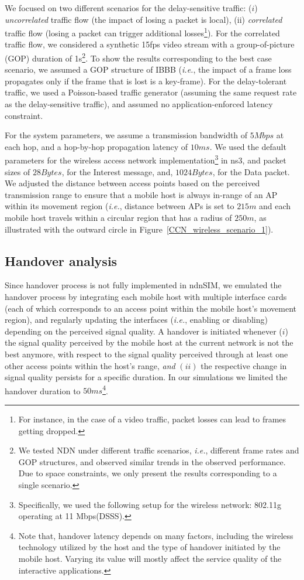 \documentclass[conference]{IEEEtran}
\begin{document}
We focused on two different scenarios for the delay-sensitive traffic: ($i$) \emph{uncorrelated} traffic flow (the impact of losing a packet is local), (ii) \emph{correlated} traffic flow (losing a packet can trigger additional losses\footnote{For instance, in the case of a video traffic, packet losses can lead to frames getting dropped.}). For the correlated traffic flow, we considered a synthetic 15fps video stream with a group-of-picture (GOP) duration of 1s\footnote{We tested NDN under different traffic scenarios, \emph{i.e.}, different frame rates and GOP structures, and observed similar trends in the observed performance. Due to space constraints, we only present the results corresponding to a single scenario.}. To show the results corresponding to the best case scenario, we assumed a GOP structure of IBBB (\emph{i.e.}, the impact of a frame loss propagates only if the frame that is lost is a key-frame). For the delay-tolerant traffic, we used a Poisson-based traffic generator (assuming the same request rate as the delay-sensitive traffic), and assumed no application-enforced latency constraint.

For the system parameters, we assume a transmission bandwidth of $5Mbps$ at each hop, and a hop-by-hop propagation latency of $10ms$. We used the default parameters for the wireless access network implementation\footnote{Specifically, we used the following setup for the wireless network: 802.11g operating at 11 Mbps(DSSS).} in ns3, and packet sizes of $28Bytes$, for the Interest message, and, $1024Bytes$, for the Data packet. We adjusted the distance between access points based on the perceived transmission range to ensure that a mobile host is always in-range of an AP within its movement region (\emph{i.e.}, distance between APs is set to $215m$ and each mobile host travels within a circular region that has a radius of $250m$, as illustrated with the outward circle in Figure~\ref{CCN_wireless_scenario_1}).

\subsection{Handover analysis}

Since handover process is not fully implemented in ndnSIM, we emulated the handover process by integrating each mobile host with multiple interface cards (each of which corresponds to an access point within the mobile host's movement region), and regularly updating the interfaces (\emph{i.e.}, enabling or disabling) depending on the perceived signal quality. A handover is initiated whenever ($i$) the signal quality perceived by the mobile host at the current network is not the best anymore, with respect to the signal quality perceived through at least one other access points within the host's range, {\emph{and}} $(ii)$ the respective change in signal quality persists for a specific duration. In our simulations we limited the handover duration to $50ms$\footnote{Note that, handover latency depends on many factors, including the wireless technology utilized by the host and the type of handover initiated by the mobile host. Varying its value will mostly affect the service quality of the interactive applications.}.
\end{document}
